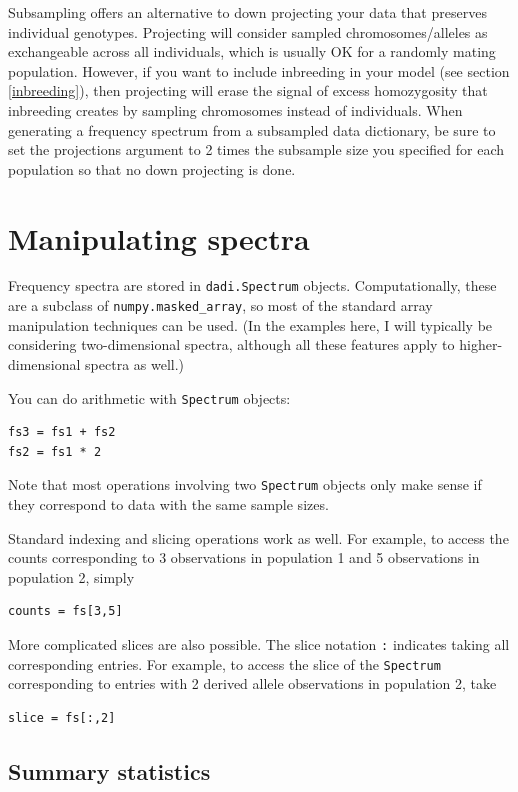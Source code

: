 \documentclass[12pt]{article}
\makeatletter
\newcommand{\py}[1]{\lstinline[language=Python, showstringspaces=False]@#1@}
\makeatother
\begin{document}
Subsampling offers an alternative to down projecting your data that preserves individual
genotypes. Projecting will consider sampled chromosomes/alleles as exchangeable across all individuals,
which is usually OK for a randomly mating population. However, if you want to include
inbreeding in your model (see section \ref{inbreeding}), then projecting will erase the
signal of excess homozygosity that inbreeding creates by sampling chromosomes
instead of individuals. When generating a frequency spectrum from a subsampled data
dictionary, be sure to set the projections argument to 2 times the subsample size you specified
for each population so that no down projecting is done.

\section{Manipulating spectra}\label{sec:manip}

Frequency spectra are stored in \py{dadi.Spectrum} objects.
Computationally, these are a subclass of \py{numpy.masked_array}, so most of the standard array manipulation techniques can be used.
(In the examples here, I will typically be considering two-dimensional spectra, although all these features apply to higher-dimensional spectra as well.)

You can do arithmetic with \py{Spectrum} objects:
\begin{lstlisting}
fs3 = fs1 + fs2
fs2 = fs1 * 2
\end{lstlisting}
Note that most operations involving two \py{Spectrum} objects only make sense if they correspond to data with the same sample sizes.

Standard indexing and slicing operations work as well.
For example, to access the counts corresponding to 3 observations in population 1 and 5 observations in population 2, simply
\begin{lstlisting}
counts = fs[3,5]
\end{lstlisting}
More complicated slices are also possible.
The slice notation \py{:} indicates taking all corresponding entries.
For example, to access the slice of the \py{Spectrum} corresponding to entries with 2 derived allele observations in population 2, take
\begin{lstlisting}
slice = fs[:,2]
\end{lstlisting}

\subsection{Summary statistics}
\end{document}
